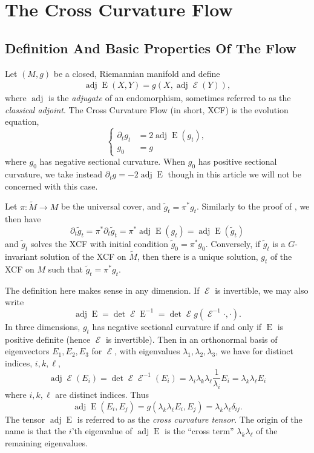 \documentclass{cambridge7a}
\renewcommand{\~}{\tilde}
\renewcommand{\-}{\bar}
\newcommand{\8}{\infty}
\DeclareMathOperator{\Ein}{E}
\DeclareMathOperator{\opEin}{\mathcal{E}}
\DeclareMathOperator{\adj}{adj}
\newcommand{\eq}[1]{\begin{equation}\begin{alignedat}{2} #1 \end{alignedat}\end{equation}}
\begin{document}
\section{The Cross Curvature Flow}
\label{sec:xcf}
\subsection{Definition And Basic Properties Of The Flow}
\label{subsec:xcf_defn}

Let \((M, g)\) be a closed, Riemannian manifold and define
\eq{\adj\Ein(X,Y)=g(X,\adj\opEin(Y)),}
where $\adj$ is the \emph{adjugate} of an endomorphism, sometimes referred to as the \emph{classical adjoint}. The Cross Curvature Flow (in short, XCF) is the evolution equation,
\begin{equation}
\label{eq:xcf}
\begin{cases}
\partial_t g_t  &= 2 \adj\Ein(g_t), \\
g_0 &= g
\end{cases}
\end{equation}
where \(g_0\) has negative sectional curvature. When \(g_0\) has positive sectional curvature, we take instead \(\partial_t g = -2\adj\Ein\) though in this article we will not be concerned with this case.
\begin{rem}
Let \(\pi : \tilde{M} \to M\) be the universal cover, and \(\tilde{g}_t = \pi^{\ast} g_t\). Similarly to the proof of , we then have
\[
\partial_t \tilde{g}_t = \pi^{\ast} \partial_t \tilde{g}_t = \pi^{\ast} \adj\Ein(g_t) = \adj\Ein(\tilde{g}_t)
\]
and \(\tilde{g}_t\) solves the XCF with initial condition \(\tilde{g}_0 = \pi^{\ast} g_0\). Conversely, if \(\tilde{g}_t\) is a \(G\)-invariant solution of the XCF on \(\tilde{M}\), then there is a unique solution, \(g_t\) of the XCF on \(M\) such that \(\tilde{g}_t = \pi^{\ast} g_t\).
\end{rem}

The definition here makes sense in any dimension. If \(\opEin\) is invertible, we may also write
\[
\adj\Ein = \det \opEin \Ein^{-1} = \det\opEin g(\opEin^{-1} \cdot, \cdot).
\]
In three dimensions, \(g_t\) has negative sectional curvature if and only if \(\Ein\) is positive definite (hence \(\opEin\) is invertible). Then in an orthonormal basis of eigenvectors \(E_1, E_2, E_3\) for \(\opEin\), with eigenvalues \(\lambda_1, \lambda_2, \lambda_3\), we have for distinct indices, \(i, k, \ell\),
\[
\adj\opEin (E_i) = \det\opEin \opEin^{-1}(E_i) = \lambda_i \lambda_k \lambda_{\ell} \frac{1}{\lambda_i} E_i = \lambda_k \lambda_{\ell} E_i
\]
where \(i,k,\ell\) are distinct indices. Thus
\begin{equation}
\label{eq:cross_curvature}
\adj\Ein(E_i, E_j) = g(\lambda_k \lambda_{\ell} E_i, E_j) = \lambda_k \lambda_{\ell} \delta_{ij}.
\end{equation}
The tensor \(\adj\Ein\) is referred to as the \emph{cross curvature tensor}. The origin of the name is that the \(i\)'th eigenvalue of \(\adj\Ein\) is the ``cross term'' \(\lambda_k \lambda_{\ell}\) of the remaining eigenvalues.
\end{document}
